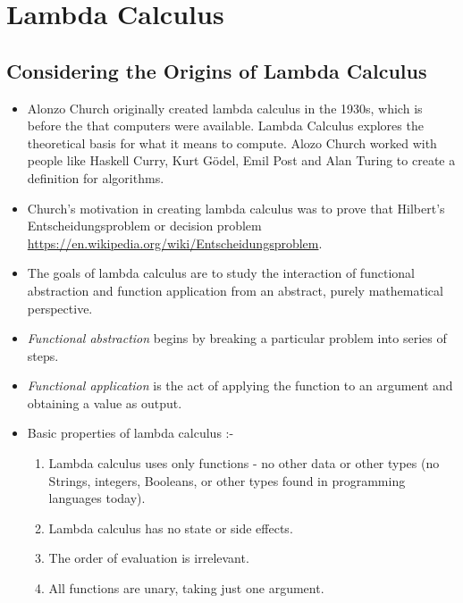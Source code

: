 \chapter{Lambda Calculus}

\section{Considering the Origins of Lambda Calculus}
\begin{itemize}
\item Alonzo Church originally created lambda calculus in the 1930s, which is before the that computers were available. Lambda Calculus explores the theoretical basis for what it means to compute. Alozo Church worked with people like Haskell Curry, Kurt Gödel, Emil Post and Alan Turing to create a definition for algorithms.
\item Church's motivation in creating lambda calculus was to prove that Hilbert's Entscheidungsproblem  or decision problem \textcolor{purple}{\url{https://en.wikipedia.org/wiki/Entscheidungsproblem}}. 
\item The goals of lambda calculus are to study the interaction of functional abstraction and function application from an abstract, purely mathematical perspective.
\item \emph{Functional abstraction} begins by breaking a particular problem into series of steps.
\item \emph{Functional application} is the act of applying the function to an argument and obtaining a value as output.
\item Basic properties of lambda calculus :-
\begin{enumerate}
\item Lambda calculus uses only functions - no other data or other types (no Strings, integers, Booleans, or other types found in programming languages today). 
\item Lambda calculus has no state or side effects.
\item The order of evaluation is irrelevant.
\item All functions are unary, taking just one argument.
\end{enumerate}
\end{itemize}

